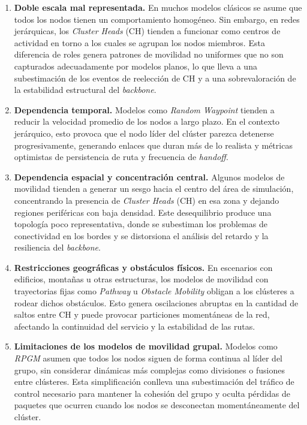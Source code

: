 \documentclass{article}
\begin{document}
\begin{enumerate}
    \item \textbf{Doble escala mal representada.}
    En muchos modelos clásicos se asume que todos los nodos tienen un comportamiento homogéneo. Sin embargo, en redes jerárquicas, los \textit{Cluster Heads} (CH) tienden a funcionar como centros de actividad en torno a los cuales se agrupan los nodos miembros. Esta diferencia de roles genera patrones de movilidad no uniformes que no son capturados adecuadamente por modelos planos, lo que lleva a una subestimación de los eventos de reelección de CH y a una sobrevaloración de la estabilidad estructural del \textit{backbone}.

    \item \textbf{Dependencia temporal.}
    Modelos como \textit{Random Waypoint} tienden a reducir la velocidad promedio de los nodos a largo plazo. En el contexto jerárquico, esto provoca que el nodo líder del clúster parezca detenerse progresivamente, generando enlaces que duran más de lo realista y métricas optimistas de persistencia de ruta y frecuencia de \textit{handoff}.

    \item \textbf{Dependencia espacial y concentración central.}
    Algunos modelos de movilidad tienden a generar un sesgo hacia el centro del área de simulación, concentrando la presencia de \textit{Cluster Heads} (CH) en esa zona y dejando regiones periféricas con baja densidad. Este desequilibrio produce una topología poco representativa, donde se subestiman los problemas de conectividad en los bordes y se distorsiona el análisis del retardo y la resiliencia del \textit{backbone}.

    \item \textbf{Restricciones geográficas y obstáculos físicos.}
    En escenarios con edificios, montañas u otras estructuras, los modelos de movilidad con trayectorias fijas como \textit{Pathway} u \textit{Obstacle Mobility} obligan a los clústeres a rodear dichos obstáculos. Esto genera oscilaciones abruptas en la cantidad de saltos entre CH y puede provocar particiones momentáneas de la red, afectando la continuidad del servicio y la estabilidad de las rutas.

    \item \textbf{Limitaciones de los modelos de movilidad grupal.}
    Modelos como \textit{RPGM} asumen que todos los nodos siguen de forma continua al líder del grupo, sin considerar dinámicas más complejas como divisiones o fusiones entre clústeres. Esta simplificación conlleva una subestimación del tráfico de control necesario para mantener la cohesión del grupo y oculta pérdidas de paquetes que ocurren cuando los nodos se desconectan momentáneamente del clúster.


\end{enumerate}
\end{document}
